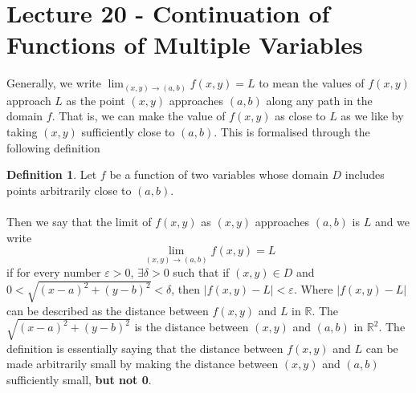 \documentclass[a6paper]{article}
\theoremstyle{definition}
\newtheorem{definition}{Definition}
\theoremstyle{plain}
\theoremstyle{remark}
\begin{document}
    \section{Lecture 20 - Continuation of Functions of Multiple Variables}
    Generally, we write $ \displaystyle \lim_{(x,y) \to (a,b)}  f(x,y) = L $ to
    mean the values of $ f(x,y) $ approach $ L $ as the point $ (x,y)
    $ approaches $ (a,b) $ along any path in the domain $ f $. That is, we can
    make the value of $ f(x,y) $ as close to $ L $ as we like by taking $ (x,y)
    $ sufficiently close to $ (a,b) $. This is formalised through the following
    definition
    \begin{definition}
    Let $ f $ be a function of two variables whose domain $ D $ includes points
    arbitrarily close to $ (a,b) $. 
    \\\\
    Then we say that the limit of $ f(x,y) $ as $ (x,y) $ approaches $ (a,b)
    $ is $ L $ and we write
    $$ \lim_{(x,y) \to (a,b)} f(x,y) = L $$
    if for every number $ \varepsilon > 0 $, $ \exists \delta > 0 $ such that
    if $ (x,y) \in D $ and $ 0 < \sqrt{(x-a)^2 + (y-b)^2} < \delta $, then
    $ |f(x,y) - L| < \varepsilon $. Where $ |f(x,y)-L| $ can be described as
    the distance between $ f(x,y) $ and $ L $ in $ \mathbb{R} $. The
    $ \sqrt{(x-a)^2 + (y-b)^2} $ is the distance between $ (x,y) $ and $ (a,b)
    $ in $ \mathbb{R}^2 $. The definition is essentially saying that the
    distance between $ f(x,y)  $ and $ L $ can be made arbitrarily small by
    making the distance between $ (x,y)  $ and $ (a,b) $ sufficiently small,
    \textbf{but not 0}.
    \end{definition}
    
\end{document}
